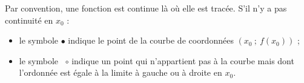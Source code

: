 \documentclass{cornouaille}
\begin{document}
\begin{exemple}
Par convention,  une fonction est continue là où elle est tracée. S'il n'y a pas continuité en $x_0$ :
\begin{itemize}
\item le symbole \textcolor{B2}{$\bullet$} indique le point de la courbe de coordonnées $(x_0~;~f(x_0))$ ;
\item le symbole  \textcolor{white}{$\bullet$}\hspace{-5.5pt}\textcolor{B2}{$\boldsymbol{\circ}$} indique un  point qui n'appartient pas à la courbe mais dont l'ordonnée est égale à la limite à gauche ou à droite en $x_0$.
\end{itemize}


\end{exemple}
\end{document}

